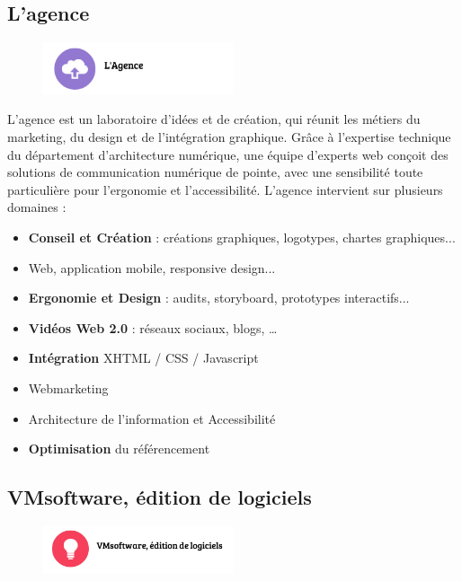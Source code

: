 \documentclass[12pt]{report}
\begin{document}
		\subsection{L'agence}

\begin{figure}[!h]
	\includegraphics[width=0.5\textwidth]{pictures/agence.png}
\end{figure}

L’agence est un laboratoire d'idées et de création, qui réunit les métiers du marketing, du design et de l'intégration graphique. Grâce à l’expertise technique du département d’architecture numérique, une équipe d’experts web conçoit des solutions de communication numérique de pointe, avec une sensibilité toute particulière pour l’ergonomie et l’accessibilité. L’agence intervient sur plusieurs domaines :\\

\begin{itemize}
\item \textbf{Conseil et Création} : créations graphiques, logotypes, chartes graphiques...
\item Web, application mobile, responsive design...
\item \textbf{Ergonomie et Design} : audits, storyboard, prototypes interactifs...
\item \textbf{Vidéos Web 2.0} : réseaux sociaux, blogs, …
\item \textbf{Intégration} XHTML / CSS / Javascript
\item Webmarketing
\item Architecture de l’information et Accessibilité
\item \textbf{Optimisation} du référencement\\
\end{itemize}

		\subsection{VMsoftware, édition de logiciels}

\begin{figure}[!h]
	\includegraphics[width=0.5\textwidth]{pictures/vmsoftware.png}
\end{figure}
\end{document}
